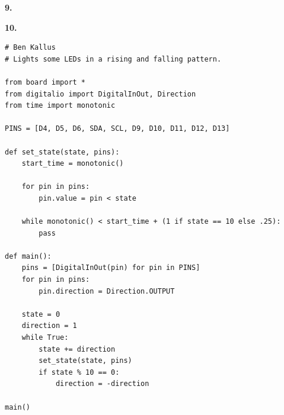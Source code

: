 \documentclass{article}
\begin{document}
\newpage\noindent\textbf{9.}

    

\newpage\noindent\textbf{10.}
\begin{verbatim}# Ben Kallus
# Lights some LEDs in a rising and falling pattern.

from board import *
from digitalio import DigitalInOut, Direction
from time import monotonic

PINS = [D4, D5, D6, SDA, SCL, D9, D10, D11, D12, D13]

def set_state(state, pins):
    start_time = monotonic()

    for pin in pins:
        pin.value = pin < state

    while monotonic() < start_time + (1 if state == 10 else .25):
        pass

def main():
    pins = [DigitalInOut(pin) for pin in PINS]
    for pin in pins:
        pin.direction = Direction.OUTPUT

    state = 0
    direction = 1
    while True:
        state += direction
        set_state(state, pins)
        if state % 10 == 0:
            direction = -direction

main()

\end{verbatim}
\end{document}

